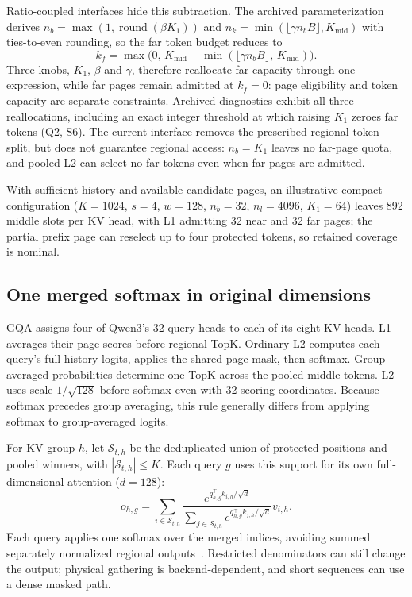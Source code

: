 \documentclass[conference,9pt,letterpaper]{IEEEtran}
\begin{document}
Ratio-coupled interfaces hide this subtraction. The archived parameterization derives $n_b=\max(1,\operatorname{round}(\beta K_1))$ and $n_k=\min(\lfloor\gamma n_bB\rfloor,K_{\mathrm{mid}})$ with ties-to-even rounding, so the far token budget reduces to
\begin{equation}
k_f=\max\bigl(0,\,K_{\mathrm{mid}}-\min(\lfloor\gamma n_bB\rfloor,\,K_{\mathrm{mid}})\bigr).
\label{eq:coupling}
\end{equation}
Three knobs, $K_1$, $\beta$ and $\gamma$, therefore reallocate far capacity through one expression, while far pages remain admitted at $k_f=0$: page eligibility and token capacity are separate constraints. Archived diagnostics exhibit all three reallocations, including an exact integer threshold at which raising $K_1$ zeroes far tokens (Q2, S6). The current interface removes the prescribed regional token split, but does not guarantee regional access: $n_b=K_1$ leaves no far-page quota, and pooled L2 can select no far tokens even when far pages are admitted.

With sufficient history and available candidate pages, an illustrative compact configuration ($K=1024$, $s=4$, $w=128$, $n_b=32$, $n_l=4096$, $K_1=64$) leaves 892 middle slots per KV head, with L1 admitting 32 near and 32 far pages; the partial prefix page can reselect up to four protected tokens, so retained coverage is nominal.

\subsection{One merged softmax in original dimensions}
GQA assigns four of Qwen3’s 32 query heads to each of its eight KV heads. L1 averages their page scores before regional TopK. Ordinary L2 computes each query’s full-history logits, applies the shared page mask, then softmax. Group-averaged probabilities determine one TopK across the pooled middle tokens. L2 uses scale $1/\sqrt{128}$ before softmax even with 32 scoring coordinates. Because softmax precedes group averaging, this rule generally differs from applying softmax to group-averaged logits.

For KV group $h$, let $\mathcal S_{t,h}$ be the deduplicated union of protected positions and pooled winners, with $|\mathcal S_{t,h}|\leq K$. Each query $g$ uses this support for its own full-dimensional attention ($d=128$):
\begin{equation}
o_{h,g}=\sum_{i\in\mathcal S_{t,h}}\frac{e^{q_{h,g}^{\top}k_{i,h}/\sqrt d}}
{\sum_{j\in\mathcal S_{t,h}}e^{q_{h,g}^{\top}k_{j,h}/\sqrt d}}v_{i,h}.
\end{equation}
Each query applies one softmax over the merged indices, avoiding summed separately normalized regional outputs~\cite{salo}. Restricted denominators can still change the output; physical gathering is backend-dependent, and short sequences can use a dense masked path.
\end{document}
